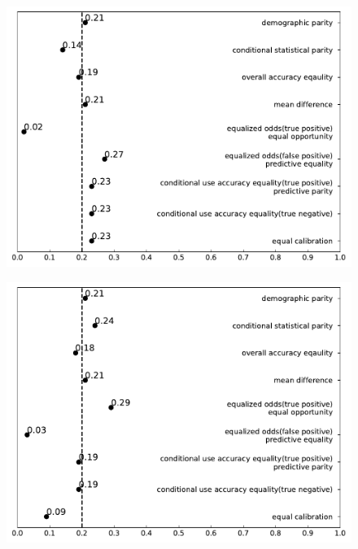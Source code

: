 \documentclass[conference]{IEEEtran}
\begin{document}
\begin{figure}[h]
\begin{minipage}[b]{0.48\linewidth}
        \centering
        \includegraphics[width=\linewidth]{Asian}
        \label{fig:2}
    \end{minipage}
    \hfill
    \begin{minipage}[b]{0.48\linewidth}
        \centering
        \includegraphics[width=\linewidth]{Native American}
        \label{fig:2}
    \end{minipage}
    \hfill
    \begin{minipage}[b]{0.48\linewidth}
        \centering

\end{minipage}
\end{figure}
\end{document}
